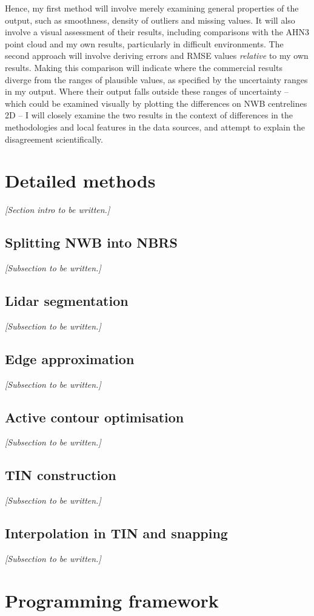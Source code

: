 Hence, my first method will involve merely examining general properties of the output, such as smoothness, density of outliers and missing values. It will also involve a visual assessment of their results, including comparisons with the AHN3 point cloud and my own results, particularly in difficult environments. The second approach will involve deriving errors and RMSE values \textit{relative} to my own results. Making this comparison will indicate where the commercial results diverge from the ranges of plausible values, as specified by the uncertainty ranges in my output. Where their output falls outside these ranges of uncertainty – which could be examined visually by plotting the differences on NWB centrelines 2D – I will closely examine the two results in the context of differences in the methodologies and local features in the data sources, and attempt to explain the disagreement scientifically.

\section{Detailed methods}
\label{sec:methods}

\textit{[Section intro to be written.]}

\subsection{Splitting NWB into NBRS}
\label{sub:m_nbrsgeneration}

\textit{[Subsection to be written.]}

\subsection{Lidar segmentation}
\label{sub:m_lidarsegmentation}

\textit{[Subsection to be written.]}

\subsection{Edge approximation}
\label{sub:m_edgeapproximation}

\textit{[Subsection to be written.]}

\subsection{Active contour optimisation}
\label{sub:m_activecontours}

\textit{[Subsection to be written.]}

\subsection{TIN construction}
\label{sub:m_tinconstruction}

\textit{[Subsection to be written.]}

\subsection{Interpolation in TIN and snapping}
\label{sub:m_interpolation}

\textit{[Subsection to be written.]}

\section{Programming framework}
\label{sec:programming}